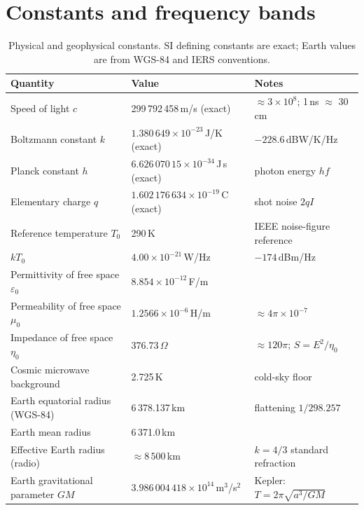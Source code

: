 \section{Constants and frequency bands}
\label{sec:appA:constants}

\begin{table}[htbp]\centering\small
\caption{Physical and geophysical constants. SI defining constants are exact; Earth values are
from WGS-84 and IERS conventions.}\label{tab:appA:constants}
\footnotesize
\begin{tabular}{@{}lll@{}}
\toprule
Quantity & Value & Notes\\
\midrule
Speed of light $c$ & 299\,792\,458\,m/s (exact) & $\approx3\times10^8$; 1\,ns $\approx$ 30\,cm\\
Boltzmann constant $k$ & $1.380\,649\times10^{-23}$\,J/K (exact) & $-228.6$\,dBW/K/Hz\\
Planck constant $h$ & $6.626\,070\,15\times10^{-34}$\,J\,s (exact) & photon energy $hf$\\
Elementary charge $q$ & $1.602\,176\,634\times10^{-19}$\,C (exact) & shot noise $2qI$\\
Reference temperature $T_0$ & 290\,K & IEEE noise-figure reference\\
$kT_0$ & $4.00\times10^{-21}$\,W/Hz & $-174$\,dBm/Hz\\
Permittivity of free space $\varepsilon_0$ & $8.854\times10^{-12}$\,F/m & \\
Permeability of free space $\mu_0$ & $1.2566\times10^{-6}$\,H/m & $\approx4\pi\times10^{-7}$\\
Impedance of free space $\eta_0$ & 376.73\,$\Omega$ & $\approx120\pi$; $S=E^2/\eta_0$\\
Cosmic microwave background & 2.725\,K & cold-sky floor\\
\midrule
Earth equatorial radius (WGS-84) & 6\,378.137\,km & flattening $1/298.257$\\
Earth mean radius & 6\,371.0\,km & \\
Effective Earth radius (radio) & $\approx8\,500$\,km & $k=4/3$ standard refraction\\
Earth gravitational parameter $GM$ & $3.986\,004\,418\times10^{14}$\,m$^3$/s$^2$ & Kepler: $T=2\pi\sqrt{a^3/GM}$\\

\end{tabular}
\end{table}
